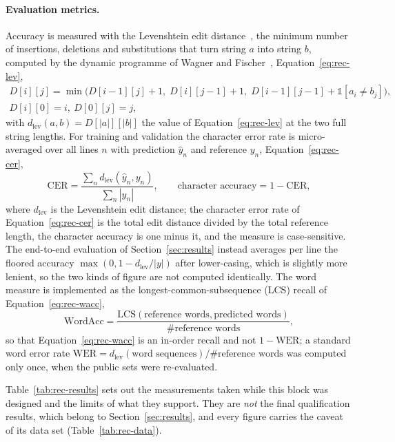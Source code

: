 \paragraph{Evaluation metrics.}
Accuracy is measured with the Levenshtein edit distance~\cite{levenshtein1966}, the minimum number of insertions, deletions and substitutions that turn string $a$ into string $b$, computed by the dynamic programme of Wagner and Fischer~\cite{wagner1974}, Equation~\ref{eq:rec-lev},
\begin{equation}
\begin{gathered}D[i][j]=\min\bigl(D[i-1][j]+1,\;D[i][j-1]+1,\;D[i-1][j-1]+\mathbb 1[a_i\ne b_j]\bigr),\\ D[i][0]=i,\ D[0][j]=j,\end{gathered}
\label{eq:rec-lev}
\end{equation}
with $d_{\mathrm{lev}}(a,b)=D[|a|][|b|]$ the value of Equation~\ref{eq:rec-lev} at the two full string lengths.
For training and validation the character error rate is micro-averaged over all lines $n$ with prediction $\hat y_n$ and reference $y_n$, Equation~\ref{eq:rec-cer},
\begin{equation}
\mathrm{CER}=\frac{\sum_nd_{\mathrm{lev}}(\hat y_n,y_n)}{\sum_n|y_n|},\qquad\text{character accuracy}=1-\mathrm{CER},
\label{eq:rec-cer}
\end{equation}
where $d_{\mathrm{lev}}$ is the Levenshtein edit distance; the character error rate of Equation~\ref{eq:rec-cer} is the total edit distance divided by the total reference length, the character accuracy is one minus it, and the measure is case-sensitive.
The end-to-end evaluation of Section~\ref{sec:results} instead averages per line the floored accuracy $\max(0,1-d_{\mathrm{lev}}/|y|)$ after lower-casing, which is slightly more lenient, so the two kinds of figure are not computed identically.
The word measure is implemented as the longest-common-subsequence (LCS) recall of Equation~\ref{eq:rec-wacc},
\begin{equation}
\mathrm{WordAcc}=\frac{\mathrm{LCS}(\text{reference words},\text{predicted words})}{\#\text{reference words}},
\label{eq:rec-wacc}
\end{equation}
so that Equation~\ref{eq:rec-wacc} is an in-order recall and not $1-\mathrm{WER}$; a standard word error rate $\mathrm{WER}=d_{\mathrm{lev}}(\text{word sequences})/\#\text{reference words}$ was computed only once, when the public sets were re-evaluated.

Table~\ref{tab:rec-results} sets out the measurements taken while this block was designed and the limits of what they support.
They are \emph{not} the final qualification results, which belong to Section~\ref{sec:results}, and every figure carries the caveat of its data set (Table~\ref{tab:rec-data}).

